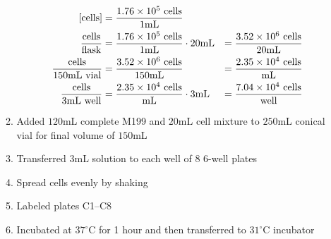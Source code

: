 \begin{enumerate}
\begin{enumerate}
				\begin{align*}
				\text{[cells]} &= \frac{1.76\times 10^{5}\text{ cells}}{1\text{mL}} \\
				\frac{\text{cells}}{\text{flask}} &= \frac{1.76\times 10^{5}\text{ cells}}{1\text{mL}} \cdot 20\text{mL} &= \frac{3.52\times 10^{6}\text{ cells}}{20\text{mL}}\\
				\frac{\text{cells}}{150\text{mL vial}} &= \frac{3.52\times 10^{6}\text{ cells}}{150\text{mL}} &= \frac{2.35\times 10^{4}\text{ cells}}{\text{mL}}\\
				\frac{\text{cells}}{3\text{mL well}} &= \frac{2.35\times 10^{4}\text{ cells}}{\text{mL}} \cdot 3\text{mL} &= \frac{7.04\times 10^{4}\text{ cells}}{\text{well}}\\
				\end{align*}
			\item Added $120$mL complete M199 and $20$mL cell mixture to $250$mL conical vial for final volume of $150$mL
			\item Transferred $3$mL solution to each well of 8 6-well plates
			\item Spread cells evenly by shaking
			\item Labeled plates C1--C8
			\item Incubated at $37^{\circ}$C for 1 hour and then transferred to $31^{\circ}$C incubator
		\end{enumerate}
\end{enumerate}

